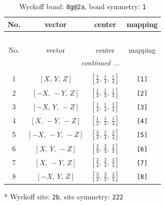 \documentclass[fleqn,8pt]{jsarticle}
\begin{document}
\renewcommand{\arraystretch}{1.2}
\begin{longtable}{cccc}
\caption{Wyckoff bond: {\tt 8g@2a}, bond symmetry: {\tt 1}}
 \\
 \hline \hline
No. & vector & center & mapping \\ \hline \endfirsthead

\multicolumn{3}{l}{\tablename\ \thetable{}} \\
 \hline \hline
No. & vector & center & mapping \\ \hline \endhead

 \hline \hline
\multicolumn{3}{r}{\footnotesize\it continued ...} \\ \endfoot

 \hline \hline
\multicolumn{3}{r}{} \\ \endlastfoot

1 & $\left[ X,\, Y,\, Z \right]$ & $\left[ \frac{1}{4},\, \frac{1}{4},\, \frac{1}{4} \right]$ & {\tt [1]} \\ \hline
2 & $\left[ - X,\, - Y,\, Z \right]$ & $\left[ \frac{1}{4},\, \frac{1}{4},\, \frac{1}{4} \right]$ & {\tt [2]} \\ \hline
3 & $\left[ - X,\, Y,\, - Z \right]$ & $\left[ \frac{1}{4},\, \frac{1}{4},\, \frac{1}{4} \right]$ & {\tt [3]} \\ \hline
4 & $\left[ X,\, - Y,\, - Z \right]$ & $\left[ \frac{1}{4},\, \frac{1}{4},\, \frac{1}{4} \right]$ & {\tt [4]} \\ \hline
5 & $\left[ - X,\, - Y,\, - Z \right]$ & $\left[ \frac{3}{4},\, \frac{3}{4},\, \frac{3}{4} \right]$ & {\tt [5]} \\ \hline
6 & $\left[ X,\, Y,\, - Z \right]$ & $\left[ \frac{3}{4},\, \frac{3}{4},\, \frac{3}{4} \right]$ & {\tt [6]} \\ \hline
7 & $\left[ X,\, - Y,\, Z \right]$ & $\left[ \frac{3}{4},\, \frac{3}{4},\, \frac{3}{4} \right]$ & {\tt [7]} \\ \hline
8 & $\left[ - X,\, Y,\, Z \right]$ & $\left[ \frac{3}{4},\, \frac{3}{4},\, \frac{3}{4} \right]$ & {\tt [8]} \\
\end{longtable}
* Wyckoff site: {\tt 2b}, site symmetry: {\tt 222}
\renewcommand{\arraystretch}{1.2}
\end{document}
